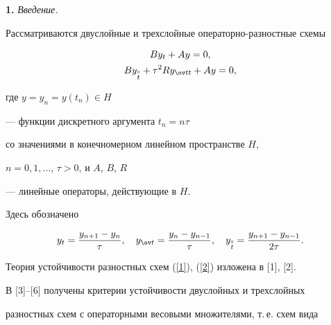 \date{}




\pagestyle{plain} %







\maketitle


\label{begin}





{\bf 1.} {\it Введение.}


Рассматриваются двуслойные и трехслойные операторно-разностные схемы


\begin{gather}


\label{1}


By_{t} +Ay=0, \\


%


\label{2}


By_{\overset{\circ}{t}} +\tau^{2}R y_{\ov tt}+Ay=0,


\end{gather}


где $y=y_{n}=y(t_{n})\in H$


--- функции дискретного аргумента $t_{n}=n\tau$


со значениями в конечномерном линейном пространстве $H$,


$n=0,1,\dotsc$, $\tau >0$, и $A$, $B$, $R$


--- линейные операторы, действующие в $H$.


Здесь обозначено


$$


y_{t}=\frac{y_{n+1}-y_{n}}{\tau},\quad y_{\ov t}=\frac{y_{n}-y_{n-1}}{\tau},


\quad y_{\overset{\circ}{t}}=\frac{y_{n+1}-y_{n-1}}{2\tau}.


$$


Теория устойчивости разностных схем (\ref{1}), (\ref{2}) изложена в [1], [2].


В [3]--[6] получены критерии устойчивости двуслойных и трехслойных


разностных схем с операторными весовыми множителями, т.\,е. схем вида


